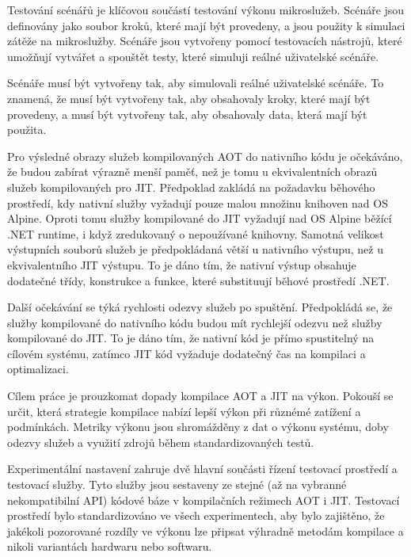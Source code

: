 


Testování scénářů je klíčovou součástí testování výkonu mikroslužeb. Scénáře jsou definovány jako soubor kroků, které mají být provedeny, a jsou použity k simulaci zátěže na mikroslužby. Scénáře jsou vytvořeny pomocí testovacích nástrojů, které umožňují vytvářet a spouštět testy, které simuluji reálné uživatelské scénáře.


Scénáře musí být vytvořeny tak, aby simulovali reálné uživatelské scénáře. To znamená, že musí být vytvořeny tak, aby obsahovaly kroky, které mají být provedeny, a musí být vytvořeny tak, aby obsahovaly data, která mají být použita.


Pro výsledné obrazy služeb kompilovaných AOT do nativního kódu je očekáváno, že budou zabírat výrazně menší paměť, než je tomu u ekvivalentních obrazů služeb kompilovaných pro JIT. Předpoklad zakládá na požadavku běhového prostředí, kdy nativní služby vyžadují pouze malou množinu knihoven nad OS Alpine. Oproti tomu služby kompilované do JIT vyžadují nad OS Alpine běžící .NET runtime, i když zredukovaný o nepoužívané knihovny. Samotná velikost výstupních souborů služeb je předpokládaná větší u nativního výstupu, než u ekvivalentního JIT výstupu. To je dáno tím, že nativní výstup obsahuje dodatečné třídy, konstrukce a funkce, které substituují běhové prostředí .NET.

Další očekávání se týká rychlosti odezvy služeb po spuštění. Předpokládá se, že služby kompilované do nativního kódu budou mít rychlejší odezvu než služby kompilované do JIT. To je dáno tím, že nativní kód je přímo spustitelný na cílovém systému, zatímco JIT kód vyžaduje dodatečný čas na kompilaci a optimalizaci.


Cílem práce je prouzkomat dopady kompilace AOT a JIT na výkon. Pokouší se určit, která strategie kompilace nabízí lepší výkon při různémé zatížení a podmínkách. Metriky výkonu jsou shromážděny z dat o výkonu systému, doby odezvy služeb a využití zdrojů během standardizovaných testů.

Experimentální nastavení zahruje dvě hlavní součásti řízení testovací prostředí a testovací služby. Tyto služby jsou sestaveny ze stejné (až na vybranné nekompatibilní API) kódové báze v kompilačních režimech AOT i JIT. Testovací prostředí bylo standardizováno ve všech experimentech, aby bylo zajištěno, že jakékoli pozorované rozdíly ve výkonu lze připsat výhradně metodám kompilace a nikoli variantách hardwaru nebo softwaru.

